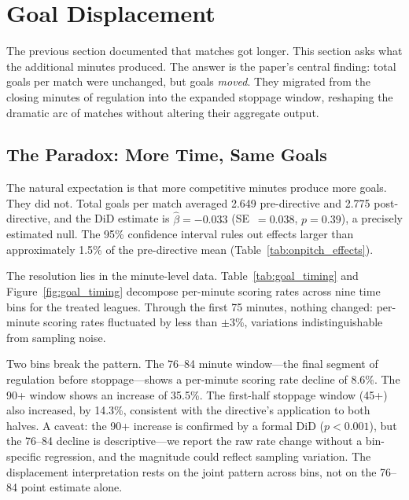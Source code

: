 
\section{Goal Displacement}
\label{sec:displacement}

The previous section documented that matches got longer. This section
asks what the additional minutes produced. The answer is the paper's
central finding: total goals per match were unchanged, but goals
\textit{moved}. They migrated from the closing minutes of regulation
into the expanded stoppage window, reshaping the dramatic arc of
matches without altering their aggregate output.


\subsection{The Paradox: More Time, Same Goals}
\label{subsec:paradox}

The natural expectation is that more competitive minutes produce more
goals. They did not. Total goals per match averaged 2.649 pre-directive
and 2.775 post-directive, and the DiD estimate is $\hat{\beta} = -0.033$
(SE~$= 0.038$, $p = 0.39$), a precisely estimated null. The 95\%
confidence interval rules out effects larger than approximately 1.5\% of
the pre-directive mean (Table~\ref{tab:onpitch_effects}).

The resolution lies in the minute-level data. Table~\ref{tab:goal_timing}
and Figure~\ref{fig:goal_timing} decompose per-minute scoring rates
across nine time bins for the treated leagues. Through the first 75
minutes, nothing changed: per-minute scoring rates fluctuated by less
than $\pm3$\%, variations indistinguishable from sampling noise.

Two bins break the pattern. The 76--84 minute window---the final
segment of regulation before stoppage---shows a per-minute scoring rate
decline of 8.6\%. The 90+ window shows an increase of 35.5\%. The
first-half stoppage window (45+) also increased, by 14.3\%, consistent
with the directive's application to both halves. A caveat: the 90+
increase is confirmed by a formal DiD ($p < 0.001$), but the 76--84
decline is descriptive---we report the raw rate change without a
bin-specific regression, and the magnitude could reflect sampling
variation. The displacement interpretation rests on the joint pattern
across bins, not on the 76--84 point estimate alone.

